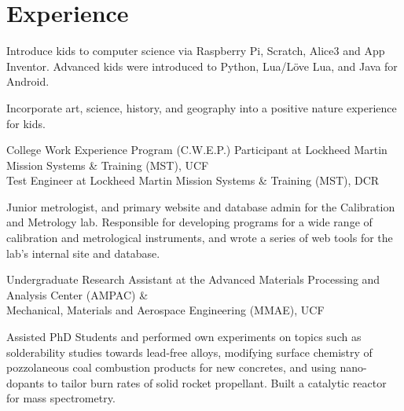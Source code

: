 \documentclass[]{resume-openfont}
\begin{document}
\begin{minipage}[t]{0.65\textwidth}

\section{Experience}
\vspace{\topsep}
\begin{tightemize}
\item Introduce kids to computer science via Raspberry Pi, Scratch, Alice3 and App Inventor. Advanced kids were introduced to Python, Lua/Löve Lua, and Java for Android.
\end{tightemize}
\begin{tightemize}
\item Incorporate art, science, history, and geography into a positive nature experience for kids.
\end{tightemize}
\sectionsep

College Work Experience Program (C.W.E.P.) Participant at Lockheed Martin Mission Systems \& Training (MST), UCF\\
Test Engineer at Lockheed Martin Mission Systems \& Training (MST), DCR\\
\begin{tightemize}
\item Junior  metrologist,  and  primary  website  and  database  admin  for  the Calibration and Metrology lab. Responsible for developing programs for a wide range of calibration and metrological instruments, and wrote a series of web tools for the lab’s internal site and database.
\end{tightemize}
\sectionsep

Undergraduate Research Assistant at the Advanced Materials Processing and Analysis Center (AMPAC) \&\\
Mechanical, Materials and Aerospace Engineering (MMAE), UCF\\
\begin{tightemize}
\item Assisted  PhD  Students  and  performed  own  experiments  on  topics  such  as solderability studies towards lead-free alloys, modifying surface chemistry of pozzolaneous coal combustion products for new concretes, and using nano-dopants to tailor burn rates of solid rocket propellant. Built a catalytic reactor for mass spectrometry.
\end{tightemize}
\sectionsep


\end{minipage}
\end{document}
